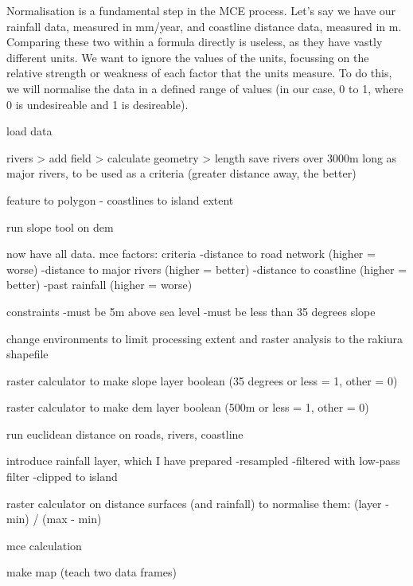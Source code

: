 \documentclass{article}
\begin{document}
Normalisation is a fundamental step in the MCE process. Let's say we have our rainfall data, measured in mm/year, and coastline distance data, measured in m. Comparing these two within a formula directly is useless, as they have vastly different units. We want to ignore the values of the units, focussing on the relative strength or weakness of each factor that the units measure. To do this, we will normalise the data in a defined range of values (in our case, 0 to 1, where 0 is undesireable and 1 is desireable).

load data

rivers > add field > calculate geometry > length
save rivers over 3000m long as major rivers, to be used as a criteria (greater distance away, the better)

feature to polygon - coastlines to island extent

run slope tool on dem

now have all data. mce factors:
criteria
-distance to road network (higher = worse)
-distance to major rivers (higher = better)
-distance to coastline (higher = better)
-past rainfall (higher = worse)

constraints
-must be 5m above sea level
-must be less than 35 degrees slope

change environments to limit processing extent and raster analysis to the rakiura shapefile

raster calculator to make slope layer boolean (35 degrees or less = 1, other = 0)

raster calculator to make dem layer boolean (500m or less = 1, other = 0)

run euclidean distance on roads, rivers, coastline

introduce rainfall layer, which I have prepared
-resampled
-filtered with low-pass filter
-clipped to island

raster calculator on distance surfaces (and rainfall) to normalise them: (layer - min) / (max - min)

mce calculation

make map (teach two data frames)
\end{document}
